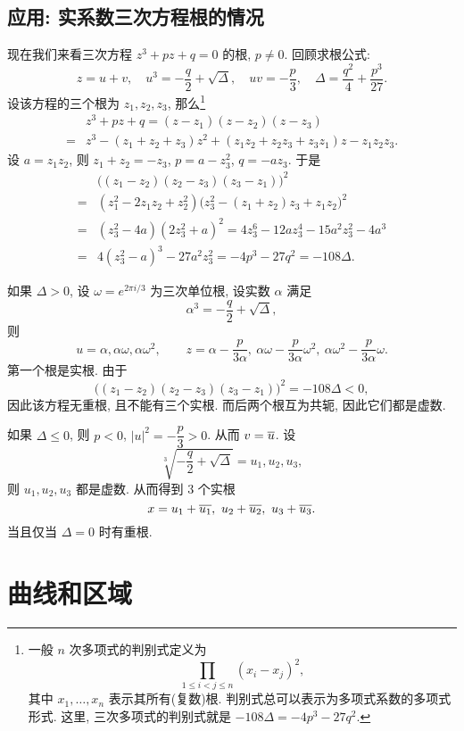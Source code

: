 \subsection{应用: 实系数三次方程根的情况\optional}
现在我们来看三次方程 $z^3+pz+q=0$ 的根, $p\neq 0$.
回顾求根公式:
  \[z=u+v,\quad u^3=-\frac q2+\sqrt{\Delta},\quad uv=-\frac p3,\quad \Delta=\frac{q^2}4+\frac{p^3}{27}.\]
设该方程的三个根为 $z_1,z_2,z_3$, 那么\footnote{%
  一般 $n$ 次多项式的判别式定义为
  \[\prod_{1\le i<j\le n}(x_i-x_j)^2,\]
  其中 $x_1,\dots,x_n$ 表示其所有(复数)根.
  判别式总可以表示为多项式系数的多项式形式.
  这里, 三次多项式的判别式就是 $-108\Delta=-4p^3-27q^2$.
}
\begin{align*}
   &z^3+pz+q=(z-z_1)(z-z_2)(z-z_3)\\
  =&z^3-(z_1+z_2+z_3)z^2+(z_1z_2+z_2z_3+z_3z_1)z-z_1z_2z_3.
\end{align*}
设 $a=z_1z_2$, 则 $z_1+z_2=-z_3$, $p=a-z_3^2$, $q=-az_3$.
于是
\begin{align*}
   &\bigl((z_1-z_2)(z_2-z_3)(z_3-z_1)\bigr)^2\\
  =&(z_1^2-2z_1z_2+z_2^2)\bigl(z_3^2-(z_1+z_2)z_3+z_1z_2\bigr)^2\\
  =&(z_3^2-4a)(2z_3^2+a)^2=4z_3^6-12az_3^4-15a^2z_3^2-4a^3\\
  =&4(z_3^2-a)^3-27a^2z_3^2=-4p^3-27q^2=-108\Delta.
\end{align*}
\begin{enumpar}
  \item 如果 $\Delta>0$, 设 $\omega=e^{2\pi i/3}$ 为三次单位根, 设实数 $\alpha$ 满足
    \[\alpha^3=-\frac q2+\sqrt{\Delta},\]
  则
    \[
      u=\alpha,\alpha\omega,\alpha\omega^2,\qquad
      z=\alpha-\frac p{3\alpha},\ 
        \alpha\omega-\frac p{3\alpha} \omega^2,\ 
        \alpha\omega^2-\frac p{3\alpha} \omega.
    \]
    第一个根是实根.
    由于
    \[\bigl((z_1-z_2)(z_2-z_3)(z_3-z_1)\bigr)^2=-108\Delta<0,\]
    因此该方程无重根, 且不能有三个实根.
    而后两个根互为共轭, 因此它们都是虚数.
  \item 如果 $\Delta\le 0$, 则 $p<0$, $|u|^2=-\dfrac p3>0$. 从而 $v=\overline u$.
    设
      \[\sqrt[3]{-\frac q2+\sqrt{\Delta}}=u_1,u_2,u_3,\]
    则 $u_1,u_2,u_3$ 都是虚数. 从而得到 $3$ 个实根
      \[x=u_1+\ov{u_1},\ u_2+\ov{u_2},\ u_3+\ov{u_3}.\]
    当且仅当 $\Delta=0$ 时有重根.
\end{enumpar}


\section{曲线和区域}

